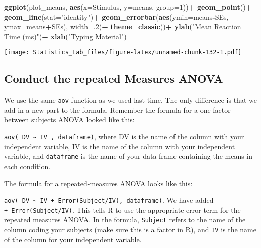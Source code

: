 \documentclass[
]{book}
\newenvironment{Shaded}{\begin{snugshade}}{\end{snugshade}}
\newcommand{\AttributeTok}[1]{\textcolor[rgb]{0.13,0.29,0.53}{#1}}
\newcommand{\DecValTok}[1]{\textcolor[rgb]{0.00,0.00,0.81}{#1}}
\newcommand{\FunctionTok}[1]{\textcolor[rgb]{0.13,0.29,0.53}{\textbf{#1}}}
\newcommand{\NormalTok}[1]{#1}
\newcommand{\SpecialCharTok}[1]{\textcolor[rgb]{0.81,0.36,0.00}{\textbf{#1}}}
\newcommand{\StringTok}[1]{\textcolor[rgb]{0.31,0.60,0.02}{#1}}
\begin{document}
\begin{Shaded}
\begin{Highlighting}[]
\FunctionTok{ggplot}\NormalTok{(plot\_means, }\FunctionTok{aes}\NormalTok{(}\AttributeTok{x=}\NormalTok{Stimulus, }\AttributeTok{y=}\NormalTok{means, }\AttributeTok{group=}\DecValTok{1}\NormalTok{))}\SpecialCharTok{+}
  \FunctionTok{geom\_point}\NormalTok{()}\SpecialCharTok{+}
  \FunctionTok{geom\_line}\NormalTok{(}\AttributeTok{stat=}\StringTok{"identity"}\NormalTok{)}\SpecialCharTok{+}
  \FunctionTok{geom\_errorbar}\NormalTok{(}\FunctionTok{aes}\NormalTok{(}\AttributeTok{ymin=}\NormalTok{means}\SpecialCharTok{{-}}\NormalTok{SEs, }\AttributeTok{ymax=}\NormalTok{means}\SpecialCharTok{+}\NormalTok{SEs), }\AttributeTok{width=}\NormalTok{.}\DecValTok{2}\NormalTok{)}\SpecialCharTok{+}
  \FunctionTok{theme\_classic}\NormalTok{()}\SpecialCharTok{+}
  \FunctionTok{ylab}\NormalTok{(}\StringTok{"Mean Reaction Time (ms)"}\NormalTok{)}\SpecialCharTok{+}
  \FunctionTok{xlab}\NormalTok{(}\StringTok{"Typing Material"}\NormalTok{)}
\end{Highlighting}
\end{Shaded}

\texttt{[image: Statistics\_Lab\_files/figure-latex/unnamed-chunk-132-1.pdf]}

\hypertarget{conduct-the-repeated-measures-anova}{%
\subsection{Conduct the repeated Measures ANOVA}\label{conduct-the-repeated-measures-anova}}

We use the same \texttt{aov} function as we used last time. The only difference is that we add in a new part to the formula. Remember the formula for a one-factor between subjects ANOVA looked like this:

\texttt{aov(\ DV\ \textasciitilde{}\ IV\ ,\ dataframe)}, where DV is the name of the column with your independent variable, IV is the name of the column with your independent variable, and \texttt{dataframe} is the name of your data frame containing the means in each condition.

The formula for a repeated-measures ANOVA looks like this:

\texttt{aov(\ DV\ \textasciitilde{}\ IV\ +\ Error(Subject/IV),\ dataframe)}. We have added \texttt{+\ Error(Subject/IV)}. This tells R to use the appropriate error term for the repeated measures ANOVA. In the formula, \texttt{Subject} refers to the name of the column coding your subjects (make sure this is a factor in R), and \texttt{IV} is the name of the column for your independent variable.
\end{document}
